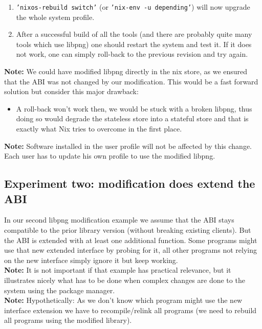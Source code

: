 \documentclass[a4paper,10pt]{article}
\begin{document}
{\begin{enumerate}
\textbf{Note:} Such a minimal testing environment could be created using a local repository, introduced in section \ref{experimentingwithpackages}, by exclusively overwriting the old libpng nix expression as illustrated for vim (with a higher version number) and the software which is using libpng must explicitly use the new libpng version.
\item \texttt{'nixos-rebuild switch'} (or \texttt{'nix-env -u depending'}) will now upgrade the whole system profile.
\item After a successful build of all the tools (and there are probably quite many tools which use libpng) one should restart the system and test it. If it does not work, one can simply roll-back to the previous revision and try again.
\end{enumerate}
\textbf{Note:} We could have modified libpng directly in the nix store, as we ensured that the ABI was not changed by our modification. This would be a fast forward solution but consider this major drawback:
\begin{itemize}
\item A roll-back won't work then, we would be stuck with a broken libpng, thus doing so would degrade the stateless store into a stateful store and that is exactly what Nix tries to overcome in the first place.
\end{itemize}
\textbf{Note:} Software installed in the user profile will not be affected by this change. Each user has to update his own profile to use the modified libpng. 
}

\subsection{Experiment two: modification does extend the ABI}
\label{experimenttwo}
In our second libpng modification example we assume that the ABI stays compatible to the prior library version (without breaking existing clients). But the ABI is extended with at least one additional function. Some programs might use that new extended interface by probing for it, all other programs not relying on the new interface simply ignore it but keep working.\\

\textbf{Note:} It is not important if that example has practical relevance, but it illustrates nicely what has to be done when complex changes are done to the system using the package manager.\\

\textbf{Note:} Hypothetically: As we don't know which program might use the new interface extension we have to recompile/relink all programs (we need to rebuild all programs using the modified library).
\end{document}
